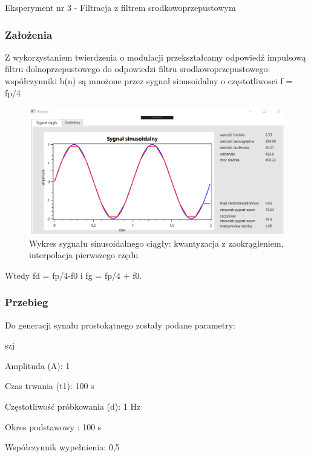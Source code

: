 \documentclass[12pt]{article}
\begin{document}
Eksperyment nr 3  - Filtracja z filtrem srodkowoprzepustowym
\subsubsection{Założenia}
Z wykorzystaniem twierdzenia o modulacji przekształcamy odpowiedź impulsową filtru dolnoprzepustowego do odpowiedzi filtru srodkowoprzepustowego:
współczynniki h(n) są mnożone przez sygnał sinusoidalny  o częstotliwosci f = fp/4

\begin{figure}[h!]
 \centering
 \includegraphics[width=12.3cm]{SinKwantZaokrIntA2T2f10H2t1C.PNG}
 \vspace{-0.3cm}
 \caption{Wykres sygnału sinusoidalnego ciągły: kwantyzacja z zaokrągleniem, interpolacja pierwszego rzędu}
 \label{Wykres dla wyników eksperymentu drugiego}
\end{figure}

Wtedy fd = fp/4-f0 i fg = fp/4 + f0.

\subsubsection{Przebieg}
Do generacji synału prostokątnego zostały podane parametry:

\begin{labeling}{szj}
\item [Amplituda (A):] 1
\item [Czas trwania (t1):] 100 s
\item [Częstotliwość próbkowania (d): ] 1 Hz
\item [Okres podstawowy :] 100 s
\item [Współczynnik wypełnienia:] 0,5
\end{labeling}
\end{document}

